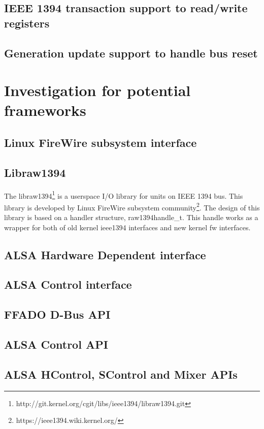\documentclass[onecolumn]{article}
\begin{document}
\subsection{IEEE 1394 transaction support to read/write registers}


\subsection{Generation update support to handle bus reset}


\section{Investigation for potential frameworks}

\subsection{Linux FireWire subsystem interface}



\subsection{Libraw1394}

The libraw1394\footnote{http://git.kernel.org/cgit/libs/ieee1394/libraw1394.git} is a userspace I/O library for units on IEEE 1394 bus. This library is developed by Linux FireWire subsystem community\footnote{https://ieee1394.wiki.kernel.org/}. The design of this library is based on a handler structure, raw1394handle\_t. This handle works as a wrapper for both of old kernel ieee1394 interfaces and new kernel fw interfaces.




\subsection{ALSA Hardware Dependent interface}
\subsection{ALSA Control interface}
\subsection{FFADO D-Bus API}
\subsection{ALSA Control API}
\subsection{ALSA HControl, SControl and Mixer APIs}
\end{document}
